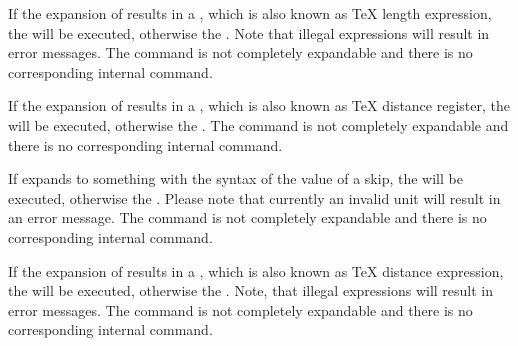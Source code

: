 \begin{Declaration}
\end{Declaration}
%
If the expansion of results in
a , which is also known as \TeX{} length expression, the
 will be executed, otherwise the . Note that illegal expressions will
result in error messages. The command is not completely expandable and there
is no corresponding internal command.%
%

\begin{Declaration}
\end{Declaration}
%
If the expansion of results in
a , which is also known as \TeX{} distance register, the
 will be executed, otherwise the . The command is not completely expandable and there is no
corresponding internal command.%
%

\begin{Declaration}
\end{Declaration}
%
If  expands to something with
the syntax of the value of a skip, the  will be
executed, otherwise the . Please
note that currently an invalid unit will result in an
error message. The command is not completely expandable and there is no
corresponding internal command.%
%

\begin{Declaration}
\end{Declaration}
%
If the expansion of results in
a , which is also known as \TeX{} distance expression, the
 will be executed, otherwise the . Note, that illegal expressions will
result in error messages. The command is not completely expandable and there
is no corresponding internal command.%
%

